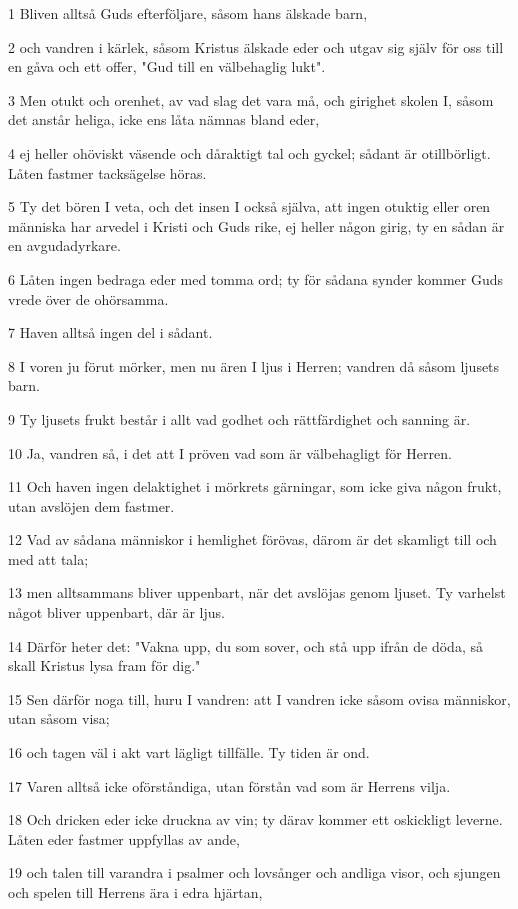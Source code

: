 \par 1 Bliven alltså Guds efterföljare, såsom hans älskade barn,
\par 2 och vandren i kärlek, såsom Kristus älskade eder och utgav sig själv för oss till en gåva och ett offer, "Gud till en välbehaglig lukt".
\par 3 Men otukt och orenhet, av vad slag det vara må, och girighet skolen I, såsom det anstår heliga, icke ens låta nämnas bland eder,
\par 4 ej heller ohöviskt väsende och dåraktigt tal och gyckel; sådant är otillbörligt. Låten fastmer tacksägelse höras.
\par 5 Ty det bören I veta, och det insen I också själva, att ingen otuktig eller oren människa har arvedel i Kristi och Guds rike, ej heller någon girig, ty en sådan är en avgudadyrkare.
\par 6 Låten ingen bedraga eder med tomma ord; ty för sådana synder kommer Guds vrede över de ohörsamma.
\par 7 Haven alltså ingen del i sådant.
\par 8 I voren ju förut mörker, men nu ären I ljus i Herren; vandren då såsom ljusets barn.
\par 9 Ty ljusets frukt består i allt vad godhet och rättfärdighet och sanning är.
\par 10 Ja, vandren så, i det att I pröven vad som är välbehagligt för Herren.
\par 11 Och haven ingen delaktighet i mörkrets gärningar, som icke giva någon frukt, utan avslöjen dem fastmer.
\par 12 Vad av sådana människor i hemlighet förövas, därom är det skamligt till och med att tala;
\par 13 men alltsammans bliver uppenbart, när det avslöjas genom ljuset. Ty varhelst något bliver uppenbart, där är ljus.
\par 14 Därför heter det: "Vakna upp, du som sover, och stå upp ifrån de döda, så skall Kristus lysa fram för dig."
\par 15 Sen därför noga till, huru I vandren: att I vandren icke såsom ovisa människor, utan såsom visa;
\par 16 och tagen väl i akt vart lägligt tillfälle. Ty tiden är ond.
\par 17 Varen alltså icke oförståndiga, utan förstån vad som är Herrens vilja.
\par 18 Och dricken eder icke druckna av vin; ty därav kommer ett oskickligt leverne. Låten eder fastmer uppfyllas av ande,
\par 19 och talen till varandra i psalmer och lovsånger och andliga visor, och sjungen och spelen till Herrens ära i edra hjärtan,
